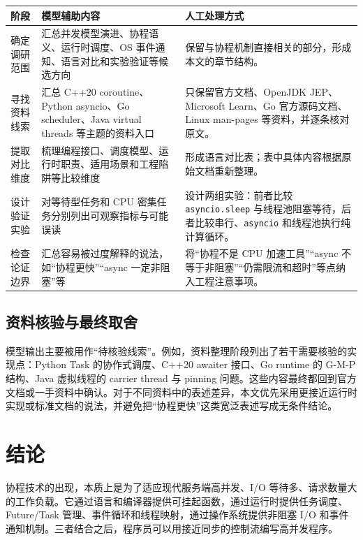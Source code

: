 \documentclass[UTF8,zihao=-4]{ctexart}
\begin{document}
\begin{center}
\begin{tabular}{p{3.2cm}p{5.4cm}p{5.4cm}}
\toprule
阶段 & 模型辅助内容 & 人工处理方式 \\
\midrule
确定调研范围 & 汇总并发模型演进、协程语义、运行时调度、OS 事件通知、语言对比和实验验证等候选方向 & 保留与协程机制直接相关的部分，形成本文的章节结构。 \\
寻找资料线索 & 汇总 C++20 coroutine、Python asyncio、Go scheduler、Java virtual threads 等主题的资料入口 & 只保留官方文档、OpenJDK JEP、Microsoft Learn、Go 官方源码文档、Linux man-pages 等资料，并逐条核对原文。 \\
提取对比维度 & 梳理编程接口、调度模型、运行时职责、适用场景和工程陷阱等比较维度 & 形成语言对比表；表中具体内容根据原始文档重新整理。 \\
设计验证实验 & 对等待型任务和 CPU 密集任务分别列出可观察指标与可能误读 & 设计两组实验：前者比较 \texttt{asyncio.sleep} 与线程池阻塞等待，后者比较串行、\texttt{asyncio} 和线程池执行纯计算循环。 \\
检查论证边界 & 汇总容易被过度解释的说法，如“协程更快”“async 一定非阻塞”等 & 将“协程不是 CPU 加速工具”“async 不等于非阻塞”“仍需限流和超时”等点纳入工程注意事项。 \\
\bottomrule
\end{tabular}
\end{center}

\subsection{资料核验与最终取舍}

模型输出主要被用作“待核验线索”。例如，资料整理阶段列出了若干需要核验的实现点：Python Task 的协作式调度、C++20 awaiter 接口、Go runtime 的 G-M-P 结构、Java 虚拟线程的 carrier thread 与 pinning 问题。这些内容最终都回到官方文档或一手资料中确认。对于不同资料中的表述差异，本文优先采用更接近运行时实现或标准文档的说法，并避免把“协程更快”这类宽泛表述写成无条件结论。

\section{结论}

协程技术的出现，本质上是为了适应现代服务端高并发、I/O 等待多、请求数量大的工作负载。它通过语言和编译器提供可挂起函数，通过运行时提供任务调度、Future/Task 管理、事件循环和线程映射，通过操作系统提供非阻塞 I/O 和事件通知机制。三者结合之后，程序员可以用接近同步的控制流编写高并发程序。
\end{document}
